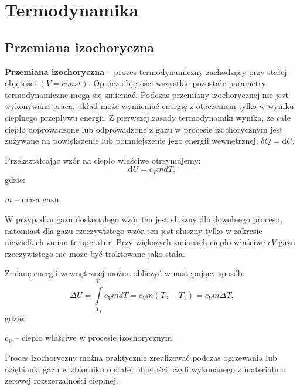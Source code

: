 \documentclass{article}
\begin{document}
\section{Termodynamika}
\subsection{Przemiana izochoryczna}

\textbf{Przemiana izochoryczna} – proces termodynamiczny zachodzący przy stałej objętości $(V = const)$. Oprócz objętości wszystkie pozostałe parametry termodynamiczne mogą się zmieniać.
Podczas przemiany izochorycznej nie jest wykonywana praca, układ może wymieniać energię z otoczeniem tylko w wyniku cieplnego przepływu energii. Z pierwszej zasady termodynamiki wynika, że całe ciepło doprowadzone lub odprowadzone z gazu w procesie izochorycznym jest zużywane na powiększenie lub pomniejszenie jego energii wewnętrznej: ${\displaystyle \delta Q={\text{d}}U}$.
\vspace{2ex}

Przekształcając wzór na ciepło właściwe otrzymujemy:
\begin{equation}
{\displaystyle {\text{d}}U=c_{V}mdT,}
\end{equation}
gdzie:

${\displaystyle m}$  – masa gazu.
\vspace{2ex}

W przypadku gazu doskonałego wzór ten jest słuszny dla dowolnego procesu, natomiast dla gazu rzeczywistego wzór ten jest słuszny tylko w zakresie niewielkich zmian temperatur. Przy większych zmianach ciepło właściwe $cV$ gazu rzeczywistego nie może być traktowane jako stała. ~\cite{LPVS05}
\vspace{2ex}

Zmianę energii wewnętrznej można obliczyć w następujący sposób:
\begin{equation}
{\displaystyle \Delta U=\int \limits _{T_{1}}^{T_{2}}{c_{V}mdT}=c_{V}m(T_{2}-T_{1})=c_{V}m\Delta T,} 
\end{equation}
gdzie:

${\displaystyle c_{V}}$ – ciepło właściwe w procesie izochorycznym.
\vspace{2ex}

Proces izochoryczny można praktycznie zrealizować podczas ogrzewania lub oziębiania gazu w zbiorniku o stałej objętości, czyli wykonanego z materiału o zerowej rozszerzalności cieplnej.
\end{document}
